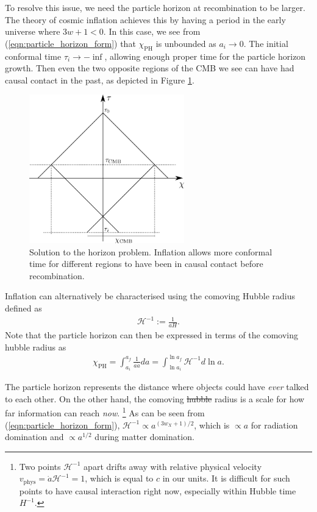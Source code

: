 \documentclass[a4paper,12pt,times,custombib,print,index]{Classes/PhDThesisPSnPDF} %
\providecommand{\DIFadd}[1]{{\protect\color{blue}\uwave{#1}}} %
\providecommand{\DIFdel}[1]{{\protect\color{red}\sout{#1}}}                      %
\providecommand{\DIFaddbegin}{} %
\providecommand{\DIFaddend}{} %
\providecommand{\DIFdelbegin}{} %
\providecommand{\DIFdelend}{} %
\newcommand{\DIFscaledelfig}{0.5}
\newlength{\DIFdelgraphicswidth} %
\newlength{\DIFdelgraphicsheight} %
\newcommand{\DIFaddincludegraphics}[2][]{{\color{blue}\fbox{\DIFOincludegraphics[#1]{#2}}}} %
\newcommand{\DIFdelincludegraphics}[2][]{%
\sbox{\DIFdelgraphicsbox}{\DIFOincludegraphics[#1]{#2}}%
\settoboxwidth{\DIFdelgraphicswidth}{\DIFdelgraphicsbox} %
\settoboxtotalheight{\DIFdelgraphicsheight}{\DIFdelgraphicsbox} %
\scalebox{\DIFscaledelfig}{%
\parbox[b]{\DIFdelgraphicswidth}{\usebox{\DIFdelgraphicsbox}\\[-\baselineskip] \rule{\DIFdelgraphicswidth}{0em}}\llap{\resizebox{\DIFdelgraphicswidth}{\DIFdelgraphicsheight}{%
\setlength{\unitlength}{\DIFdelgraphicswidth}%
\begin{picture}(1,1)%
\thicklines\linethickness{2pt} %
{\color[rgb]{1,0,0}\put(0,0){\framebox(1,1){}}}%
{\color[rgb]{1,0,0}\put(0,0){\line( 1,1){1}}}%
{\color[rgb]{1,0,0}\put(0,1){\line(1,-1){1}}}%
\end{picture}%
}\hspace*{3pt}}} %
} %
\DeclareRobustCommand{\DIFaddbegin}{\DIFOaddbegin \let\includegraphics\DIFaddincludegraphics} %
\DeclareRobustCommand{\DIFaddend}{\DIFOaddend \let\includegraphics\DIFOincludegraphics} %
\DeclareRobustCommand{\DIFdelbegin}{\DIFOdelbegin \let\includegraphics\DIFdelincludegraphics} %
\DeclareRobustCommand{\DIFdelend}{\DIFOaddend \let\includegraphics\DIFOincludegraphics} %
\begin{document}
To resolve this issue, we need the particle horizon at recombination to be larger. The theory of cosmic inflation achieves this by having a period in the early universe where $3w+1<0$. In this case, we see from (\ref{eqn:particle_horizon_form}) that $\chi_\text{PH}$ is unbounded as $a_i \rightarrow 0$. The initial conformal time \DIFdelbegin \DIFdel{$\tau_i \rightarrow -\inf$}\DIFdelend \DIFaddbegin \DIFadd{$\tau_i \rightarrow -\infty$}\DIFaddend , allowing enough proper time for the particle horizon growth. Then even the two opposite regions of the CMB we see can have had causal contact in the past, as depicted in Figure \ref{fig:horizon_solution}.
\begin{figure}[htbp!] 
	\centering    
	\includegraphics[width=0.6\textwidth]{horizon_solution.png}
	\caption{Solution to the horizon problem. Inflation allows more conformal time for different regions to have been in causal contact before recombination.}
	\label{fig:horizon_solution}
\end{figure}

Inflation can alternatively be characterised using the comoving Hubble radius defined as
\begin{align}
	\mathcal{H}^{-1} := \frac{1}{aH}.
\end{align}
Note that the particle horizon can then be expressed in terms of the comoving hubble radius as
\begin{align}
	\chi_\text{PH} = \int_{a_i}^{a_f} \frac{1}{a \dot{a}} da = \int_{\ln a_i}^{\ln a_f} \mathcal{H}^{-1} d\ln a. \label{eqn:particle_horizon_comoving_hubble}
\end{align}

The particle horizon represents the distance where objects could have \textit{ever} talked to each other. On the other hand, the comoving \DIFdelbegin \DIFdel{hubble }\DIFdelend \DIFaddbegin \DIFadd{Hubble }\DIFaddend radius is a scale for how far information can reach \textit{now}. \footnote{Two points $\mathcal{H}^{-1}$ apart drifts away with relative physical velocity $v_\text{phys} = \dot{a} \mathcal{H}^{-1} = 1$, which is equal to $c$ in our units. It is difficult for such points to have causal interaction right now, especially within Hubble time $H^{-1}$.} As can be seen from (\ref{eqn:particle_horizon_form}), $\mathcal{H}^{-1} \propto a^{(3w_X+1)/2}$, which is $\propto a$ for radiation domination and $\propto a^{1/2}$ during matter domination.
\end{document}
